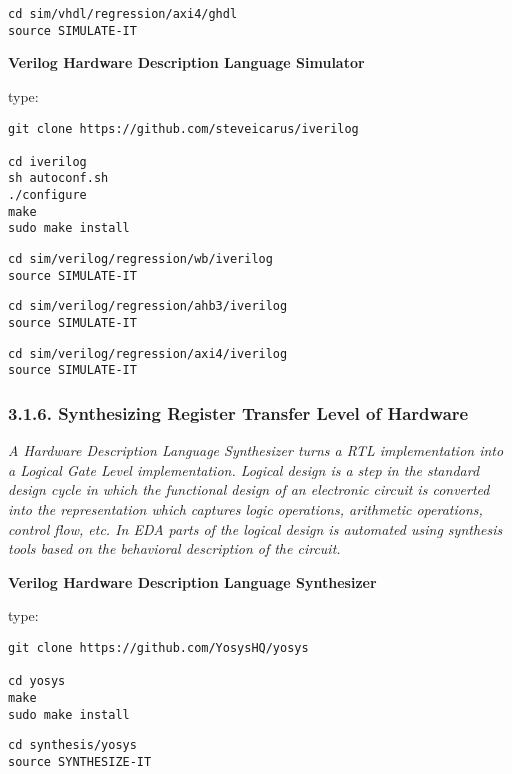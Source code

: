 \documentclass[]{article}
\begin{document}
\begin{verbatim}
cd sim/vhdl/regression/axi4/ghdl
source SIMULATE-IT
\end{verbatim}

\textbf{Verilog Hardware Description Language Simulator}

type:

\begin{verbatim}
git clone https://github.com/steveicarus/iverilog

cd iverilog
sh autoconf.sh
./configure
make
sudo make install
\end{verbatim}

\begin{verbatim}
cd sim/verilog/regression/wb/iverilog
source SIMULATE-IT
\end{verbatim}

\begin{verbatim}
cd sim/verilog/regression/ahb3/iverilog
source SIMULATE-IT
\end{verbatim}

\begin{verbatim}
cd sim/verilog/regression/axi4/iverilog
source SIMULATE-IT
\end{verbatim}

\subsubsection{3.1.6. Synthesizing Register Transfer Level of
Hardware}\label{synthesizing-register-transfer-level-of-hardware}

\emph{A Hardware Description Language Synthesizer turns a RTL
implementation into a Logical Gate Level implementation. Logical design
is a step in the standard design cycle in which the functional design of
an electronic circuit is converted into the representation which
captures logic operations, arithmetic operations, control flow, etc. In
EDA parts of the logical design is automated using synthesis tools based
on the behavioral description of the circuit.}

\textbf{Verilog Hardware Description Language Synthesizer}

type:

\begin{verbatim}
git clone https://github.com/YosysHQ/yosys

cd yosys
make
sudo make install
\end{verbatim}

\begin{verbatim}
cd synthesis/yosys
source SYNTHESIZE-IT
\end{verbatim}
\end{document}

